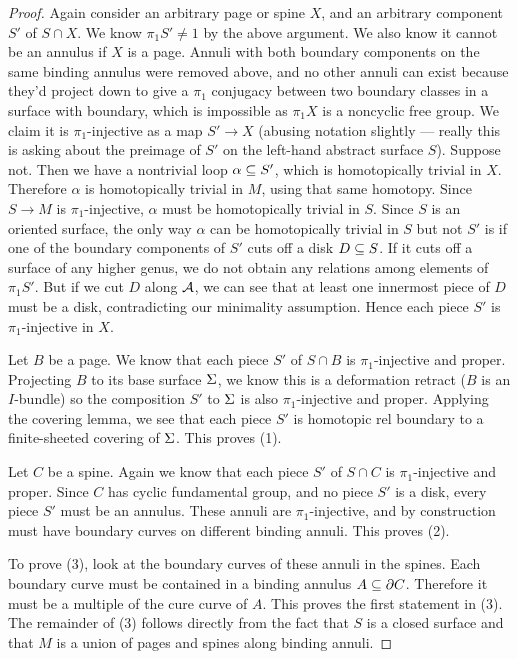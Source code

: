 \begin{proof}
Again consider an arbitrary page or spine $X$, and an arbitrary component $S'$
of $S \cap X$.  We know $\pi_1S' \neq 1$ by the above argument. We also know it
cannot be an annulus if $X$ is a page. Annuli with both boundary components on
the same binding annulus were removed above, and no other annuli can exist
because they'd project down to give a $\pi_1$ conjugacy between two boundary
classes in a surface with boundary, which is impossible as $\pi_1X$ is
a noncyclic free group.  We claim it is $\pi_1$-injective as a map $S' \to X$
(abusing notation slightly --- really this is asking about the preimage of $S'$
on the left-hand abstract surface $S$).  Suppose not. Then we have a nontrivial
loop $\alpha \subseteq S'$, which is homotopically trivial in $X$.  Therefore
$\alpha$ is homotopically trivial in $M$, using that same homotopy.  Since $S
\to M$ is $\pi_1$-injective, $\alpha$ must be homotopically trivial in $S$.
Since $S$ is an oriented surface, the only way $\alpha$ can be homotopically
trivial in $S$ but not $S'$ is if one of the boundary components of $S'$ cuts
off a disk $D \subseteq S$. If it cuts off a surface of any higher genus, we do not
obtain any relations among elements of $\pi_1S'$.  But if we cut $D$ along
$\mathcal{A}$, we can see that at least one innermost piece of $D$ must be a disk,
contradicting our minimality assumption.  Hence each piece $S'$ is
$\pi_1$-injective in $X$.

Let $B$ be a page. We know that each piece $S'$ of $S \cap B$ is
$\pi_1$-injective and proper. Projecting $B$ to its base surface $\Sigma$, we know
this is a deformation retract ($B$ is an $I$-bundle) so the composition $S'$ to
$\Sigma$ is also $\pi_1$-injective and proper. Applying the covering lemma, we see
that each piece $S'$ is homotopic rel boundary to a finite-sheeted covering of
$\Sigma$.  This proves (1).

Let $C$ be a spine. Again we know that each piece $S'$ of $S \cap C$ is
$\pi_1$-injective and proper. Since $C$ has cyclic fundamental group, and no
piece $S'$ is a disk, every piece $S'$ must be an annulus. These annuli are
$\pi_1$-injective, and by construction must have boundary curves on different
binding annuli.  This proves (2).

To prove (3), look at the boundary curves of these annuli in the spines. Each
boundary curve must be contained in a binding annulus $A \subseteq \partial C$. Therefore
it must be a multiple of the cure curve of $A$. This proves the first statement
in (3). The remainder of (3) follows directly from the fact that $S$ is
a closed surface and that $M$ is a union of pages and spines along binding
annuli.

\end{proof}

